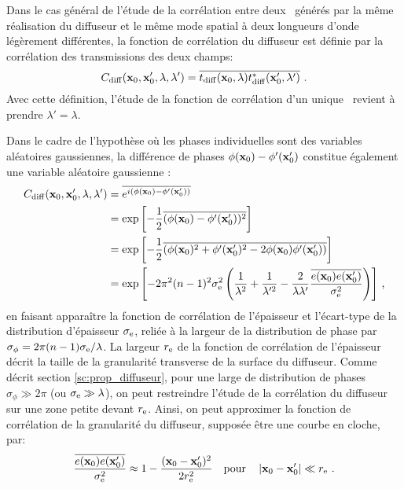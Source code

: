 Dans le cas général de l'étude de la corrélation entre deux \speckles\ générés par la même réalisation du diffuseur et le même mode spatial à deux longueurs d'onde légèrement différentes, la fonction de corrélation du diffuseur est définie par la corrélation des transmissions des deux champs:
\begin{equation}
C_{\mathrm{diff}}(\mathbf{x}_0,\mathbf{x}_0',\lambda,\lambda')=\overline{t_{\mathrm{diff}}(\mathbf{x}_0,\lambda)t_{\mathrm{diff}}^*(\mathbf{x}_0',\lambda')} \text{ .}
\end{equation}
Avec cette définition, l'étude de la fonction de corrélation d'un unique \speckle\ revient à prendre $\lambda'=\lambda$. 

Dans le cadre de l'hypothèse où les phases individuelles sont des variables aléatoires gaussiennes, la différence de phases $\phi(\mathbf{x}_0)-\phi'(\mathbf{x}_0')$ constitue également une variable aléatoire gaussienne \citep{goodman2007speckle}:
\begin{align}
C_{\mathrm{diff}}(\mathbf{x}_0,\mathbf{x}_0',\lambda,\lambda') &= \overline{e^{i(\phi(\mathbf{x}_0) - \phi'(\mathbf{x}_0'))}} \\
&= \exp{\left[-\frac{1}{2} \overline{(\phi(\mathbf{x}_0)-\phi'(\mathbf{x}_0'))^2}\right]} \\
&= \exp{\left[ -\frac{1}{2} \overline{(\phi(\mathbf{x}_0)^2 + \phi'(\mathbf{x}_0')^2 -2 \phi(\mathbf{x}_0) \phi'(\mathbf{x}_0'))} \right] } \\
&= \exp{\left[-2\pi^2 (n-1)^2 \sigma_{\mathrm{e}}^2 \left( \frac{1}{\lambda^2} + \frac{1}{\lambda'^2} - \frac{2}{\lambda\lambda'} \frac{\overline{e(\mathbf{x}_0)e(\mathbf{x}_0')}}{\sigma_{\mathrm{e}}^2}\right)\right]} \text{ ,}
\end{align}
en faisant apparaître la fonction de corrélation de l'épaisseur et l'écart-type de la distribution d'épaisseur $\sigma_{\mathrm{e}}$, reliée à la largeur de la distribution de phase par $\sigma_{\phi} = 2\pi (n-1) \sigma_{\mathrm{e}} /\lambda$. La largeur $r_{\mathrm{e}}$ de la fonction de corrélation de l'épaisseur décrit la taille de la granularité transverse de la surface du diffuseur. Comme décrit section \ref{sc:prop_diffuseur}, pour une large de distribution de phases $\sigma_{\phi} \gg 2\pi$ (ou $\sigma_{\mathrm{e}} \gg \lambda$), on peut restreindre l'étude de la corrélation du diffuseur sur une zone petite devant $r_{\mathrm{e}}$. Ainsi, on peut approximer la fonction de corrélation de la granularité du diffuseur, supposée être une courbe en cloche, par:
\begin{equation}
\frac{\overline{e(\mathbf{x}_0)e(\mathbf{x}_0')}}{\sigma_{\mathrm{e}}^2}\approx 1- \frac{(\mathbf{x}_0 - \mathbf{x}_0')^2}{2r_{\mathrm{e}}^2} \quad \text{pour} \quad \left| \mathbf{x}_0-\mathbf{x}_0' \right| \ll r_{\mathrm{e}} \text{ .}
\end{equation}

